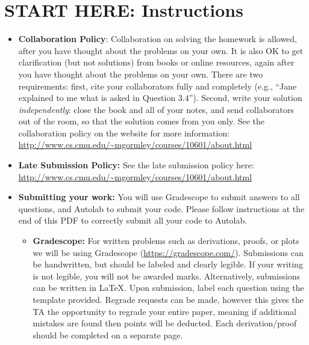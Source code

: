 \documentclass[11pt]{article}
\numberwithin{equation}{section} %
\numberwithin{figure}{section} %
\numberwithin{table}{section} %
\begin{document}
\section*{START HERE: Instructions}
\begin{itemize}

\item \textbf{Collaboration Policy}: Collaboration on solving the homework is allowed, after you have thought about the problems on your own. It is also OK to get clarification (but not solutions) from books or online resources, again after you have thought about the problems on your own. There are two requirements: first, cite your collaborators fully and completely (e.g., ``Jane explained to me what is asked in Question 3.4''). Second, write your solution {\em independently}: close the book and all of your notes, and send collaborators out of the room, so that the solution comes from you only.  See the collaboration policy on the website for more information: \url{http://www.cs.cmu.edu/~mgormley/courses/10601/about.html}
\item\textbf{Late Submission Policy:} See the late submission policy
  here:
  \url{http://www.cs.cmu.edu/~mgormley/courses/10601/about.html}

\item\textbf{Submitting your work:} You will use Gradescope to submit
  answers to all questions, and Autolab to submit your code. Please
  follow instructions at the end of this PDF to correctly submit all your code to Autolab.

  \begin{itemize}

   \item \textbf{Gradescope:} For written problems such as derivations,
       proofs, or plots we will be using Gradescope
       (\url{https://gradescope.com/}). Submissions can be handwritten, but
       should be labeled and clearly legible. If your writing is not
       legible, you will not be awarded marks. Alternatively, submissions
       can be written in LaTeX. Upon submission, label each question
       using the template provided. Regrade requests can be made, however
       this gives the TA the opportunity to regrade your entire paper,
       meaning if additional mistakes are found then points will be
       deducted.
       Each derivation/proof should be  completed on a separate page.


\end{itemize}
\end{itemize}
\end{document}
